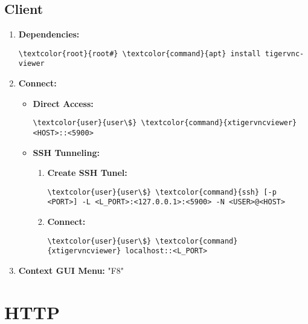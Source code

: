 \documentclass[10pt, a4paper, onecolumn, openany]{book} %
\begin{document}
\subsection{Client}
\begin{enumerate}
    \item \textbf{Dependencies:}
\begin{Verbatim}[commandchars=\\\{\}]
\textcolor{root}{root#} \textcolor{command}{apt} install tigervnc-viewer
\end{Verbatim}    
    \item \textbf{Connect:}
    \begin{itemize}
        \item \textbf{Direct Access:}
\begin{Verbatim}[commandchars=\\\{\}]
\textcolor{user}{user\$} \textcolor{command}{xtigervncviewer} <HOST>::<5900>
\end{Verbatim}   
    \item \textbf{SSH Tunneling:}
    \begin{enumerate}
        \item \textbf{Create SSH Tunel:}
\begin{Verbatim}[commandchars=\\\{\}]
\textcolor{user}{user\$} \textcolor{command}{ssh} [-p <PORT>] -L <L_PORT>:<127.0.0.1>:<5900> -N <USER>@<HOST>
\end{Verbatim}          
        \item \textbf{Connect:}
\begin{Verbatim}[commandchars=\\\{\}]
\textcolor{user}{user\$} \textcolor{command}{xtigervncviewer} localhost::<L_PORT>
\end{Verbatim}  
    \end{enumerate}
    \end{itemize}
    \item \textbf{Context GUI Menu:}
    \newline "F8"
\end{enumerate}
\section{HTTP}
\end{document}
